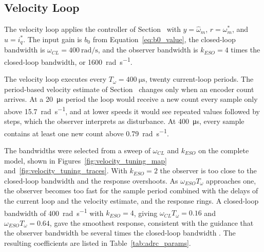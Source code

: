 \subsection{Velocity Loop}\label{sec:velocityLoop}

The velocity loop applies the controller of Section~ with $y = \hat{\omega}_m$, $r = \omega_m^{*}$, and $u = i_q^{*}$. The input gain is $b_0$ from Equation~\eqref{eq:b0_value}, the closed-loop bandwidth is $\omega_{CL} = \SI{400}{\radian\per\second}$, and the observer bandwidth is $k_{ESO} = 4$ times the closed-loop bandwidth, or \SI{1600}{\radian\per\second}.

The velocity loop executes every $T_\omega = \SI{400}{\micro\second}$, twenty current-loop periods. The period-based velocity estimate of Section~ changes only when an encoder count arrives. At a \SI{20}{\micro\second} period the loop would receive a new count every sample only above \SI{15.7}{\radian\per\second}, and at lower speeds it would see repeated values followed by steps, which the observer interprets as disturbance. At \SI{400}{\micro\second}, every sample contains at least one new count above \SI{0.79}{\radian\per\second}.

The bandwidths were selected from a sweep of $\omega_{CL}$ and $k_{ESO}$ on the complete model, shown in Figures~\ref{fig:velocity_tuning_map} and~\ref{fig:velocity_tuning_traces}. With $k_{ESO} = 2$ the observer is too close to the closed-loop bandwidth and the response overshoots. As $\omega_{ESO} T_\omega$ approaches one, the observer becomes too fast for the sample period combined with the delays of the current loop and the velocity estimate, and the response rings. A closed-loop bandwidth of \SI{400}{\radian\per\second} with $k_{ESO} = 4$, giving $\omega_{CL} T_\omega = 0.16$ and $\omega_{ESO} T_\omega = 0.64$, gave the smoothest response, consistent with the guidance that the observer bandwidth be several times the closed-loop bandwidth \cite{gao_scaling_2003,herbst_tuning_2023}. The resulting coefficients are listed in Table~\ref{tab:adrc_params}.

